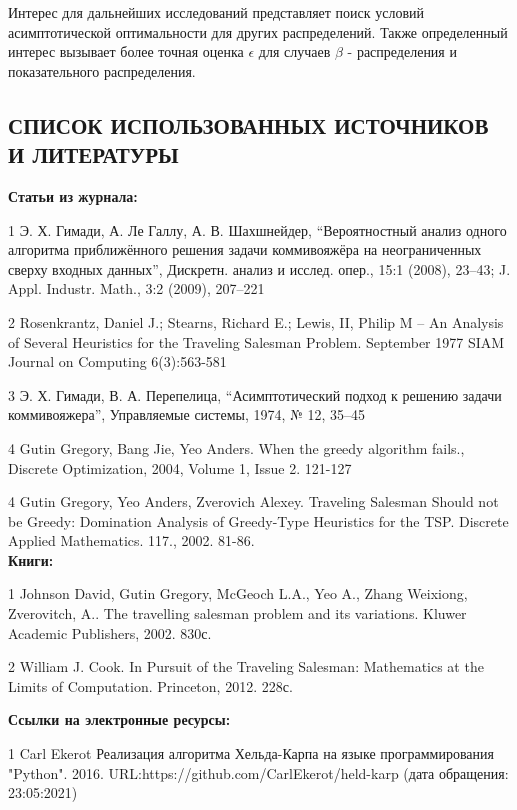 \documentclass[a4paper, 14pt]{extarticle}
\numberwithin{equation}{section}
\begin{document}
Интерес для дальнейших исследований представляет поиск условий асимптотической оптимальности для других распределений. Также определенный интерес вызывает более точная оценка $\epsilon$ для случаев $\beta$ - распределения и показательного распределения.



\newpage

\begin{center}
\chapter{\textbf{СПИСОК ИСПОЛЬЗОВАННЫХ ИСТОЧНИКОВ И ЛИТЕРАТУРЫ}}
\end{center}

\textbf{Статьи из журнала:}

1 Э. Х. Гимади, А. Ле Галлу, А. В. Шахшнейдер, “Вероятностный анализ одного алгоритма приближённого решения задачи коммивояжёра на неограниченных сверху входных данных”, Дискретн. анализ и исслед. опер., 15:1 (2008), 23–43; J. Appl. Industr. Math., 3:2 (2009), 207–221

2 Rosenkrantz, Daniel J.; Stearns, Richard E.; Lewis, II, Philip M -- An Analysis of Several Heuristics for the Traveling Salesman Problem. September 1977 SIAM Journal on Computing 6(3):563-581

3 Э. Х. Гимади, В. А. Перепелица, “Асимптотический подход к решению задачи коммивояжера”, Управляемые системы, 1974, № 12, 35–45

4 Gutin Gregory, Bang Jie, Yeo Anders. When the greedy algorithm fails., Discrete Optimization, 2004, Volume 1, Issue 2. 121-127

4 Gutin Gregory, Yeo Anders, Zverovich Alexey. Traveling Salesman Should not be Greedy: Domination Analysis of Greedy-Type Heuristics for the TSP. Discrete Applied Mathematics. 117., 2002. 81-86.\\


\textbf{Книги:}

1 Johnson David, Gutin Gregory, McGeoch L.A., Yeo A., Zhang Weixiong, Zverovitch, A.. The travelling salesman problem and its variations. Kluwer Academic Publishers, 2002. 830с.

2 William J. Cook. In Pursuit of the Traveling Salesman: Mathematics at the Limits of Computation. Princeton, 2012. 228с.

\textbf{Ссылки на электронные ресурсы:}

1 Carl Ekerot Реализация алгоритма Хельда-Карпа на языке программирования "Python". 2016. URL:https://github.com/CarlEkerot/held-karp (дата обращения: 23:05:2021)
\end{document}
